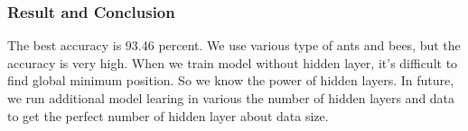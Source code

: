\documentclass{article}
\begin{document}
\begin{CJK}{UTF8}{}
\subsubsection{Result and Conclusion}
The best accuracy is 93.46 percent. We use various type of ants and bees, but the accuracy is very high. When we train model without hidden layer, it's difficult to find global minimum position. So we know the power of hidden layers.\newline
In future, we run additional model learing in various the number of hidden layers and data to get the perfect number of hidden layer about data size.

\end{CJK}
\end{document}
